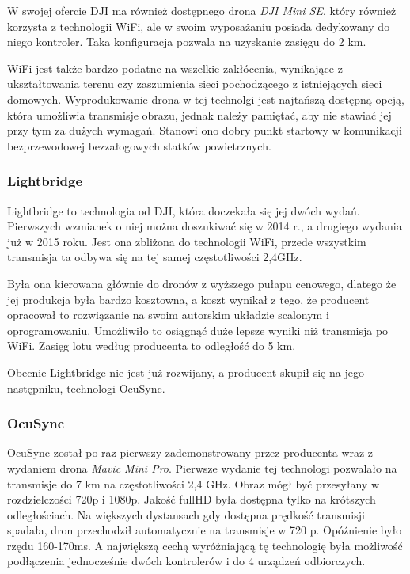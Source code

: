 W swojej ofercie DJI ma również dostępnego drona \textit{DJI Mini SE}, który również korzysta z technologii WiFi, ale w swoim wyposażaniu posiada dedykowany do niego kontroler. Taka konfiguracja pozwala na uzyskanie zasięgu do 2 km. \cite{dji-mavic-mini-se-spec}

WiFi jest także bardzo podatne na wszelkie zakłócenia, wynikające z ukształtowania terenu czy zaszumienia sieci pochodzącego z istniejących sieci domowych. Wyprodukowanie drona w tej technolgi jest najtańszą dostępną opcją, która umożliwia transmisje obrazu, jednak należy pamiętać, aby nie stawiać jej przy tym za dużych wymagań. Stanowi ono dobry punkt startowy w komunikacji bezprzewodowej bezzałogowych statków powietrznych.

\subsubsection{Lightbridge}

Lightbridge to technologia od DJI, która doczekała się jej dwóch wydań. Pierwszych wzmianek o niej można doszukiwać się w 2014 r., a drugiego wydania już w 2015 roku. Jest ona zbliżona do technologii WiFi, przede wszystkim transmisja ta odbywa się na tej samej częstotliwości 2,4GHz.


Była ona kierowana głównie do dronów z wyższego pułapu cenowego, dlatego że jej produkcja była bardzo kosztowna, a koszt wynikał z tego, że producent opracował to rozwiązanie na swoim autorskim układzie scalonym i oprogramowaniu. Umożliwiło to osiągnąć duże lepsze wyniki niż transmisja po WiFi. Zasięg lotu według producenta to odległość do 5 km.


Obecnie Lightbridge nie jest już rozwijany, a producent skupił się na jego następniku, technologi OcuSync. \cite{lightbridge-dji}\cite{lightbridge2-dji}

\subsubsection{OcuSync} 
OcuSync został po raz pierwszy zademonstrowany przez producenta wraz z wydaniem drona \emph{Mavic Mini Pro}. Pierwsze wydanie tej technologi pozwalało na transmisje do 7 km na częstotliwości 2,4 GHz. Obraz mógł być przesyłany w rozdzielczości 720p i 1080p. Jakość fullHD była dostępna tylko na krótszych odległościach. Na większych dystansach gdy dostępna prędkość transmisji spadała, dron przechodził automatycznie na transmisje w 720 p. Opóźnienie było rzędu 160-170ms. A największą cechą wyróżniającą tę technologię była możliwość podłączenia jednocześnie dwóch kontrolerów i do 4 urządzeń odbiorczych.

